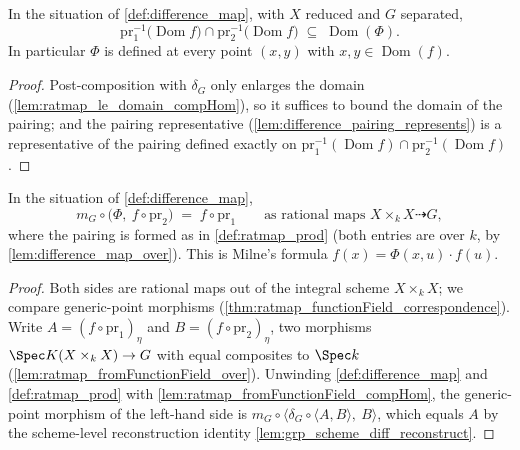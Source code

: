 \begin{theorem}
  \label{thm:difference_map_domain}
  \leanok
  In the situation of \ref{def:difference_map}, with \(X\) reduced and \(G\)
  separated,
  \[
    \mathrm{pr}_1^{-1}\bigl(\operatorname{Dom} f\bigr) \cap
    \mathrm{pr}_2^{-1}\bigl(\operatorname{Dom} f\bigr)
    \;\subseteq\;
    \operatorname{Dom}(\Phi).
  \]
  In particular \(\Phi\) is defined at every point \((x, y)\) with
  \(x, y \in \operatorname{Dom}(f)\).
\end{theorem}
\begin{proof}
  \leanok
  Post-composition with \(\delta_G\) only enlarges the domain
  (\ref{lem:ratmap_le_domain_compHom}), so it suffices to bound the domain of
  the pairing; and the pairing representative
  (\ref{lem:difference_pairing_represents}) is a representative of the pairing
  defined exactly on
  \(\mathrm{pr}_1^{-1}(\operatorname{Dom} f) \cap
  \mathrm{pr}_2^{-1}(\operatorname{Dom} f)\).
\end{proof}

\begin{theorem}
  \label{thm:difference_reconstruct}
  \leanok
  In the situation of \ref{def:difference_map},
  \[
    m_G \circ \bigl(\Phi,\ f \circ \mathrm{pr}_2\bigr)
    \;=\; f \circ \mathrm{pr}_1
    \qquad\text{as rational maps } X \times_k X \dashrightarrow G,
  \]
  where the pairing is formed as in \ref{def:ratmap_prod} (both entries are over
  \(k\), by \ref{lem:difference_map_over}). This is Milne's formula
  \(f(x) = \Phi(x, u) \cdot f(u)\).
\end{theorem}
\begin{proof}
  \leanok
  Both sides are rational maps out of the integral scheme \(X \times_k X\); we
  compare generic-point morphisms
  (\ref{thm:ratmap_functionField_correspondence}). Write
  \(A = (f \circ \mathrm{pr}_1)_\eta\) and \(B = (f \circ \mathrm{pr}_2)_\eta\),
  two morphisms \(\Spec K(X \times_k X) \to G\) with equal composites to
  \(\Spec k\) (\ref{lem:ratmap_fromFunctionField_over}). Unwinding
  \ref{def:difference_map} and \ref{def:ratmap_prod} with
  \ref{lem:ratmap_fromFunctionField_compHom}, the generic-point morphism of the
  left-hand side is
  \(m_G \circ \bigl\langle \delta_G \circ \langle A, B\rangle,\ B\bigr\rangle\),
  which equals \(A\) by the scheme-level reconstruction identity
  \ref{lem:grp_scheme_diff_reconstruct}.
\end{proof}

